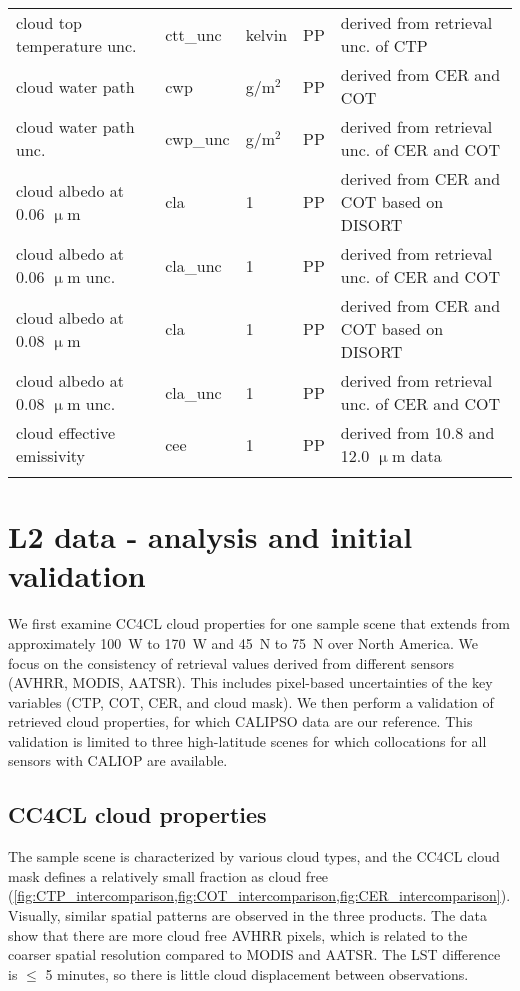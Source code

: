 \begin{table*}[h]
\begin{tabular}{l|l|l|l|l}
    cloud top temperature unc. & ctt\_unc & kelvin & PP & derived from retrieval unc. of CTP \\
    cloud water path & cwp & g/m$^2$ & PP & derived from CER and COT \citep{Han94} \\
    cloud water path unc. & cwp\_unc & g/m$^2$ & PP & derived from retrieval unc. of CER and COT \\
    cloud albedo at 0.06 $\upmu$m & cla & 1 & PP & derived from CER and COT based on DISORT \citep{Laszlo16} \\
    cloud albedo at 0.06 $\upmu$m unc. & cla\_unc & 1 & PP & derived from retrieval unc. of CER and COT \\
    cloud albedo at 0.08 $\upmu$m & cla & 1 & PP & derived from CER and COT based on DISORT \citep{Laszlo16}\\
    cloud albedo at 0.08 $\upmu$m unc. & cla\_unc & 1 & PP & derived from retrieval unc. of CER and COT \\
    cloud effective emissivity & cee & 1 & PP & derived from 10.8 and 12.0 $\upmu$m data \\
    \bottomhline
  \end{tabular}
  \label{tab:L2_variables}
\end{table*}

\section{L2 data - analysis and initial validation}\label{L2_data}

We first examine CC4CL cloud properties for one sample scene that extends from approximately 100\textdegree\ W to 170\textdegree\ W and 45\textdegree\ N to 75\textdegree\ N over North America. We focus on the consistency of retrieval values derived from different sensors (AVHRR, MODIS, AATSR). This includes pixel-based uncertainties of the key variables (CTP, COT, CER, and cloud mask). We then perform a validation of retrieved cloud properties, for which CALIPSO data are our reference. This validation is limited to three high-latitude scenes for which collocations for all sensors with CALIOP are available.

\subsection{CC4CL cloud properties}

The sample scene is characterized by various cloud types, and the CC4CL cloud mask defines a relatively small fraction as cloud free (\cref{fig:CTP_intercomparison,fig:COT_intercomparison,fig:CER_intercomparison}). Visually, similar spatial patterns are observed in the three products. The data show that there are more cloud free AVHRR pixels, which is related to the coarser spatial resolution compared to MODIS and AATSR. The LST difference is $\le$ 5 minutes, so there is little cloud displacement between observations.

